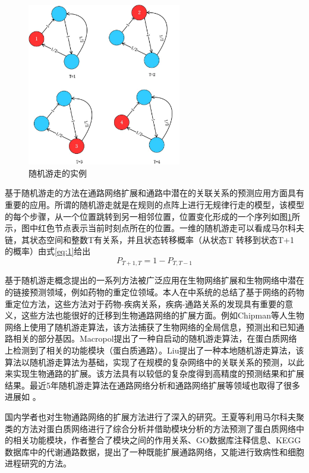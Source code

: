 \begin{figure}
\centering
\includegraphics[width = 0.6\textwidth]{rw}
\caption[fig2]{随机游走的实例}
\label{fig2}
\end{figure}


基于随机游走的方法在通路网络扩展和通路中潜在的关联关系的预测应用方面具有重要的应用。所谓的随机游走就是在规则的点阵上进行无规律行走的模型，该模型的每个步骤，从一个位置跳转到另一相邻位置，位置变化形成的一个序列如图\ref{fig2}所示，图中红色节点表示当前时刻点所在的位置。一维的随机游走可以看成马尔科夫链，其状态空间和整数T有关系，并且状态转移概率（从状态T 转移到状态T+1 的概率）由式\ref{eq:1}给出
\begin{equation}\label{eq:1}
	P_{T+1,T} = 1-P_{T,T-1}
\end{equation}

基于随机游走概念提出的一系列方法被广泛应用在生物网络扩展和生物网络中潜在的链接预测领域，例如药物的重定位领域。本人在\cite{xue2018review}中系统的总结了基于网络的药物重定位方法，这些方法对于药物-疾病关系，疾病-通路关系的发现具有重要的意义，这些方法也能很好的迁移到生物通路网络的扩展方面。例如Chipman\cite{chipman2009predicting}等人生物网络上使用了随机游走算法，该方法捕获了生物网络的全局信息，预测出和已知通路相关的部分基因。Macropol\cite{macropol2009rrw}提出了一种自启动的随机游走算法，在蛋白质网络上检测到了相关的功能模块（蛋白质通路）。Liu\cite{liu2010link}提出了一种本地随机游走算法，该算法以随机游走算法为基础，实现了在规模的复杂网络中的关联关系的预测，以此来实现生物通路的扩展。该方法具有以较低的复杂度得到高精度的预测结果和扩展结果。最近5年随机游走算法在通路网络分析和通路网络扩展等领域也取得了很多进展如 \cite{huang2018bioinformatic, agrawal2018large,li2018computational,wu2018leveraging, lee2018identification}。

国内学者也对生物通路网络的扩展方法进行了深入的研究。王夏\cite{wang2009}等利用马尔科夫聚类的方法对蛋白质网络进行了综合分析并借助模块分析的方法预测了蛋白质网络中的相关功能模块，作者整合了模块之间的作用关系、GO数据库注释信息、KEGG\cite{kanehisa2008kegg}数据库中的代谢通路数据，提出了一种既能扩展通路网络，又能进行致病性和细胞进程研究的方法。


